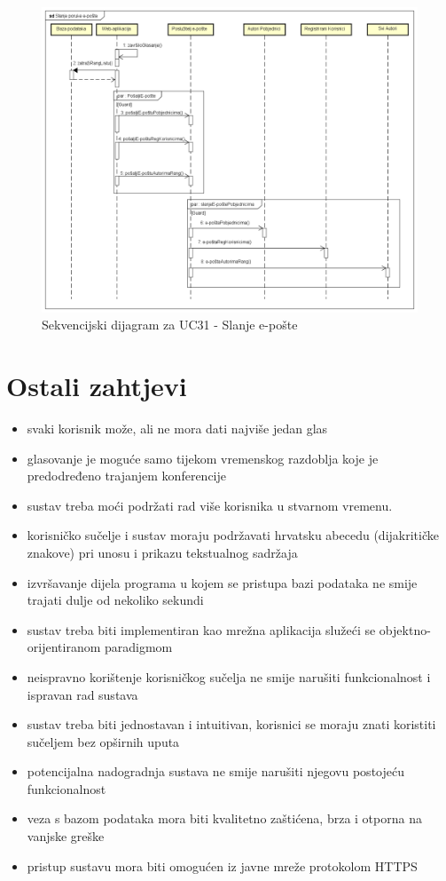 				\begin{figure}[hp!]
					\includegraphics[width=\linewidth]{Slike/SD_SlanjeEPoste.png}
					\caption{Sekvencijski dijagram za UC31 - Slanje e-pošte}
				\end{figure}
				
				\newpage
				
				\eject
			
		\section{Ostali zahtjevi}
		
			 \begin{itemize}
			 	\item svaki korisnik može, ali ne mora dati najviše jedan glas
			 	\item glasovanje je moguće samo tijekom vremenskog razdoblja koje je predodređeno trajanjem konferencije
			 	\item sustav treba moći podržati rad više korisnika u stvarnom vremenu.
			 	\item korisničko sučelje i sustav moraju podržavati hrvatsku abecedu (dijakritičke
			 	znakove) pri unosu i prikazu tekstualnog sadržaja
			 	\item izvršavanje dijela programa u kojem se pristupa bazi podataka ne smije trajati dulje od nekoliko sekundi
			 	\item sustav treba biti implementiran kao mrežna aplikacija služeći se objektno-orijentiranom paradigmom
			 	\item neispravno korištenje korisničkog sučelja ne smije narušiti funkcionalnost i ispravan rad sustava
			 	\item sustav treba biti jednostavan i intuitivan, korisnici se moraju znati koristiti sučeljem bez opširnih uputa
			 	\item potencijalna nadogradnja sustava ne smije narušiti njegovu postojeću funkcionalnost
			 	\item veza s bazom podataka mora biti kvalitetno zaštićena, brza i otporna na vanjske greške
			 	\item pristup sustavu mora biti omogućen iz javne mreže protokolom HTTPS
			 \end{itemize}
			 
			 
			 
	